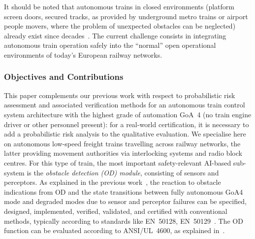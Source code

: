\documentclass[runningheads,a4paper]{llncs}
\begin{document}
It should be noted that   autonomous trains in closed environments (platform screen doors, secured tracks, as provided by underground metro trains or airport  people movers,  where the problem of unexpected obstacles can be neglected) already exist since decades~\cite{flammini_rssrail_2022}. The current challenge consists in integrating autonomous train operation safely into  the ``normal'' open operational environments of today's European railway networks.

\subsubsection*{Objectives and   Contributions}

This paper complements our previous work \cite{isolapaper2022}
with respect to probabilistic risk assessment and associated verification methods for an autonomous train control system architecture with the highest grade of automation GoA~4 (no train engine driver or other personnel present): for a real-world certification, it is necessary to 
add a probabilistic risk analysis to the qualitative evaluation. We specialise here on autonomous low-speed freight trains travelling across railway networks, the latter providing movement authorities via interlocking systems and radio block centres. For this type of train, the most important safety-relevant AI-based sub-system is the  \emph{obstacle detection (OD) module}, consisting of sensors and perceptors. As explained in the previous work~\cite{isolapaper2022}, the reaction to obstacle indications from OD and the state transitions between fully autonomous GoA4 mode and degraded modes due to sensor and perceptor failures can be specified, designed, implemented, verified, validated, and certified  with conventional methods, typically according to standards like EN~50128, EN~50129~\cite{CENELEC50128,CENELEC50129}. The OD function can be evaluated according to   ANSI/UL~4600\xspace, as explained in~\cite{isolapaper2022}.  
\end{document}
